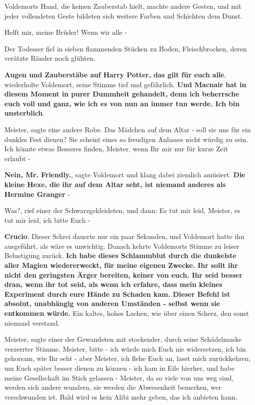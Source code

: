 Voldemorts Hand, die keinen Zauberstab hielt, machte andere Gesten, und mit
jeder vollendeten Geste bildeten sich weitere Farben und Schichten dem Dunst.

\glqq{}Helft mir, meine Brüder! Wenn wir alle -\grqq{}

Der Todesser fiel in sieben flammenden Stücken zu Boden, Fleischbrocken, deren
verätzte Ränder noch glühten.

\glqq{}\textbf{Augen und Zauberstäbe auf Harry Potter, das gilt für euch
alle}\grqq{}, wiederholte Voldemort, seine Stimme tief und gefährlich. \glqq{}
\textbf{Und Macnair hat in diesem Moment in purer Dummheit gehandelt, denn ich
beherrsche euch voll und ganz, wie ich es von nun an immer tun werde. Ich bin
unsterblich}.\grqq{}

\glqq{}Meister\grqq{}, sagte eine andere Robe. \glqq{}Das Mädchen auf dem Altar -
soll sie uns für ein dunkles Fest dienen? Sie scheint eines so freudigen
Anlasses nicht würdig zu sein. Ich könnte etwas Besseres finden, Meister, wenn
Ihr mir nur für kurze Zeit erlaubt -\grqq{}

\glqq{}\textbf{Nein, Mr. Friendly.}\grqq{}, sagte Voldemort und klang dabei
ziemlich amüsiert. \glqq{}\textbf{Die kleine Hexe, die ihr auf dem Altar seht,
ist niemand anderes als Hermine Granger} -\grqq{}

\glqq{}Was?\grqq{}, rief einer der Schwarzgekleideten, und dann: \glqq{}Es tut mir
leid, Meister, es tut mir leid, ich bitte Euch -\grqq{}

\glqq{}\textbf{Crucio}.\grqq{} Dieser Schrei dauerte nur ein paar Sekunden, und
Voldemort hatte ihn ausgeführt, als wäre es unwichtig. Danach kehrte Voldemorts
Stimme zu leiser Belustigung zurück. \glqq{}\textbf{Ich habe dieses Schlammblut
durch die dunkelste aller Magien wiedererweckt, für meine eigenen Zwecke. Ihr
sollt ihr nicht den geringsten Ärger bereiten, keiner von euch. Ihr seid besser
dran, wenn ihr tot seid, als wenn ich erfahre, dass mein kleines Experiment
durch eure Hände zu Schaden kam. Dieser Befehl ist absolut, unabhängig von
anderen Umständen - selbst wenn sie entkommen würde.}\grqq{} Ein kaltes, hohes Lachen,
wie über einen Scherz, den sonst niemand verstand.

\glqq{}Meister\grqq{}, sagte einer der Gewandeten mit stockender, durch seine
Schädelmaske verzerrter Stimme. \glqq{}Meister, bitte - ich würde mich Euch nie
widersetzen, ich bin gehorsam, wie Ihr seht - aber Meister, ich flehe Euch an,
lasst mich zurückkehren, um Euch später besser dienen zu können - ich kam in
Eile hierher, und habe meine Gesellschaft im Stich gelassen - Meister, da so
viele von uns weg sind, werden sich andere wundern, sie werden die Abwesenheit
bemerken, wer verschwunden ist. Bald wird es kein Alibi mehr geben, das ich
anbieten kann.\grqq{}

